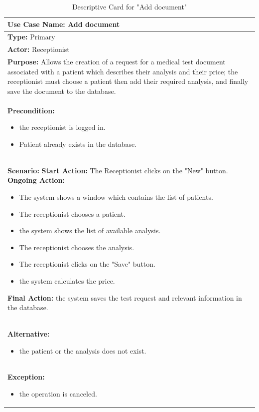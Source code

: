 \documentclass{article}
\begin{document}
\begin{table}[h]
\setlength{\tabcolsep}{10pt}
\renewcommand{\arraystretch}{1.5}
    \begin{tabular}{|p{\linewidth}|}
        \hline
        \textbf{Use Case Name:} Add document\\ 
        \hline
        \textbf{Type:} Primary\\ 
        \hline
        \textbf{Actor:} Receptionist\\ 
        \hline
        \textbf{Purpose:} Allows the creation of a request for a medical test document associated with a patient which describes their analysis and their price; the receptionist must choose a patient then add their required analysis, and finally save the document to the database.
        \\ 
        \hline
        \textbf{Precondition:}
        \begin{itemize}
            \item the receptionist is logged in.
            \item  Patient already exists in the database.
        \end{itemize}
       \\ 
        \hline
        \textbf{Scenario:}
        \vspace{0.2cm}
        \newline
        \vspace{0.2cm}
        \textbf{Start Action:} The Receptionist clicks on the "New" button.
        \newline
        \textbf{Ongoing Action:}  
        \begin{itemize}
            \item The system shows a window which contains the list of patients.
            \item The receptionist chooses a patient.
            \item the system shows the list of available analysis.
            \item The receptionist chooses the analysis.
            \item The receptionist clicks on the "Save" button.
            \item the system calculates the price.
        \end{itemize}
        \textbf{Final Action:} the system saves the test request and relevant information in the database.\\
        \hline
        \textbf{Alternative:} 
        \begin{itemize}
            \item the patient or the analysis does not exist.
        \end{itemize}\\ 
        \hline
        \textbf{Exception:}
        \begin{itemize}
            \item the operation is canceled. 
        \end{itemize}\\ 
        \hline
    \end{tabular}
    \caption{Descriptive Card for "Add document"}
    \label{tab:my-table}
\end{table}
\end{document}
